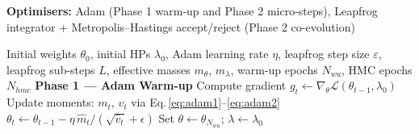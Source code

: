 \documentclass[12pt,a4paper]{article}
\begin{document}
\begin{algorithm}[tb]
\caption{Method A — Hamiltonian HMC Training (HHD)}
\label{alg:hhd}
\textbf{Optimisers:} Adam (Phase 1 warm-up and Phase 2 micro-steps),
Leapfrog integrator + Metropolis--Hastings accept/reject (Phase 2 co-evolution)
\begin{algorithmic}[1]
\Require Initial weights $\theta_0$, initial HPs $\lambda_0$,
         Adam learning rate $\eta$,
         leapfrog step size $\varepsilon$,
         leapfrog sub-steps $L$,
         effective masses $m_\theta$, $m_\lambda$,
         warm-up epochs $N_{wu}$,
         HMC epochs $N_{hmc}$
\State \textbf{Phase 1 — Adam Warm-up}
  \State Compute gradient $g_t \leftarrow \nabla_\theta\mathcal{L}(\theta_{t-1}, \lambda_0)$
  \State Update moments: $m_t$, $v_t$ via Eq.\,\eqref{eq:adam1}--\eqref{eq:adam2}
  \State $\theta_t \leftarrow \theta_{t-1} - \eta\,\hat{m}_t / (\sqrt{\hat{v}_t} + \epsilon)$
\EndFor
\State Set $\theta \leftarrow \theta_{N_{wu}}$; $\lambda \leftarrow \lambda_0$


\end{algorithmic}
\end{algorithm}
\end{document}
